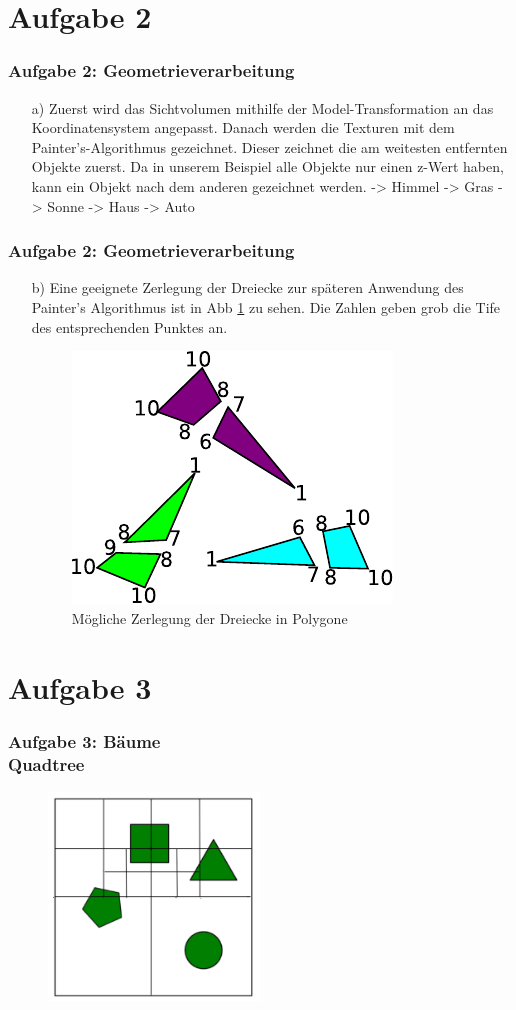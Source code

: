 \documentclass[accentcolor=tud9c,colorbacktitle,inverttitle,landscape,german,presentation,t]{tudbeamer}
\begin{document}
\section{Aufgabe 2}
	\begin{frame}
		\frametitle{Aufgabe 2: Geometrieverarbeitung}
		\begin{itemize}
		\item[a)] Zuerst wird das Sichtvolumen mithilfe der Model-Transformation an das Koordinatensystem angepasst. Danach werden die Texturen mit dem Painter's-Algorithmus gezeichnet. Dieser zeichnet die am weitesten entfernten Objekte zuerst. Da in unserem Beispiel alle Objekte nur einen z-Wert haben, kann ein Objekt nach dem anderen gezeichnet werden. -> Himmel -> Gras -> Sonne -> Haus -> Auto
		\end{itemize}
	\end{frame}
	\begin{frame}
	\frametitle{Aufgabe 2: Geometrieverarbeitung} 
	\begin{itemize}
		\item[b)]
		Eine geeignete Zerlegung der Dreiecke zur späteren Anwendung des Painter's Algorithmus ist in Abb \ref{painters} zu sehen. Die Zahlen geben grob die Tife des entsprechenden Punktes an.
		\begin{figure}
			\includegraphics[width = .45\linewidth]{painters.pdf}
			\caption{Mögliche Zerlegung der Dreiecke in Polygone}
			\label{painters}
		\end{figure}
	\end{itemize}
\end{frame}
	
\section{Aufgabe 3}
\begin{frame}
	\frametitle{Aufgabe 3: B\"aume \\Quadtree} 
	\begin{figure}
		\centering
		\includegraphics[width=0.5\textwidth]{Quadtree}
	\end{figure}
\end{frame}
\end{document}
